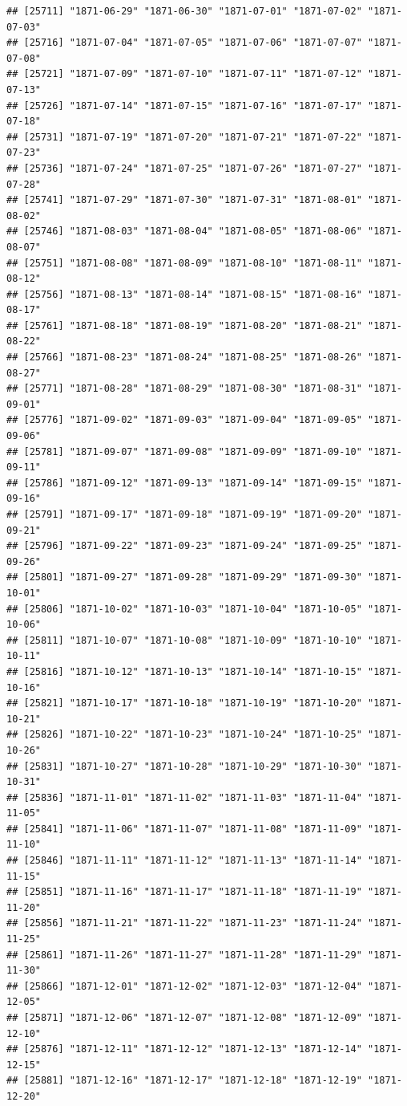 \documentclass{article}\usepackage[]{graphicx}\usepackage[]{color}
\makeatletter
\newenvironment{kframe}{%
 \def\at@end@of@kframe{}%
 \ifinner\ifhmode%
  \def\at@end@of@kframe{\end{minipage}}%
  \begin{minipage}{\columnwidth}%
 \fi\fi%
 \def\FrameCommand##1{\hskip\@totalleftmargin \hskip-\fboxsep
 \colorbox{shadecolor}{##1}\hskip-\fboxsep
     \hskip-\linewidth \hskip-\@totalleftmargin \hskip\columnwidth}%
 \MakeFramed {\advance\hsize-\width
   \@totalleftmargin\z@ \linewidth\hsize
   \@setminipage}}%
 {\par\unskip\endMakeFramed%
 \at@end@of@kframe}
\newenvironment{knitrout}{}{} %
\makeatother
\begin{document}
\begin{description}
\begin{knitrout}
\begin{kframe}
\begin{verbatim}
## [25711] "1871-06-29" "1871-06-30" "1871-07-01" "1871-07-02" "1871-07-03"
## [25716] "1871-07-04" "1871-07-05" "1871-07-06" "1871-07-07" "1871-07-08"
## [25721] "1871-07-09" "1871-07-10" "1871-07-11" "1871-07-12" "1871-07-13"
## [25726] "1871-07-14" "1871-07-15" "1871-07-16" "1871-07-17" "1871-07-18"
## [25731] "1871-07-19" "1871-07-20" "1871-07-21" "1871-07-22" "1871-07-23"
## [25736] "1871-07-24" "1871-07-25" "1871-07-26" "1871-07-27" "1871-07-28"
## [25741] "1871-07-29" "1871-07-30" "1871-07-31" "1871-08-01" "1871-08-02"
## [25746] "1871-08-03" "1871-08-04" "1871-08-05" "1871-08-06" "1871-08-07"
## [25751] "1871-08-08" "1871-08-09" "1871-08-10" "1871-08-11" "1871-08-12"
## [25756] "1871-08-13" "1871-08-14" "1871-08-15" "1871-08-16" "1871-08-17"
## [25761] "1871-08-18" "1871-08-19" "1871-08-20" "1871-08-21" "1871-08-22"
## [25766] "1871-08-23" "1871-08-24" "1871-08-25" "1871-08-26" "1871-08-27"
## [25771] "1871-08-28" "1871-08-29" "1871-08-30" "1871-08-31" "1871-09-01"
## [25776] "1871-09-02" "1871-09-03" "1871-09-04" "1871-09-05" "1871-09-06"
## [25781] "1871-09-07" "1871-09-08" "1871-09-09" "1871-09-10" "1871-09-11"
## [25786] "1871-09-12" "1871-09-13" "1871-09-14" "1871-09-15" "1871-09-16"
## [25791] "1871-09-17" "1871-09-18" "1871-09-19" "1871-09-20" "1871-09-21"
## [25796] "1871-09-22" "1871-09-23" "1871-09-24" "1871-09-25" "1871-09-26"
## [25801] "1871-09-27" "1871-09-28" "1871-09-29" "1871-09-30" "1871-10-01"
## [25806] "1871-10-02" "1871-10-03" "1871-10-04" "1871-10-05" "1871-10-06"
## [25811] "1871-10-07" "1871-10-08" "1871-10-09" "1871-10-10" "1871-10-11"
## [25816] "1871-10-12" "1871-10-13" "1871-10-14" "1871-10-15" "1871-10-16"
## [25821] "1871-10-17" "1871-10-18" "1871-10-19" "1871-10-20" "1871-10-21"
## [25826] "1871-10-22" "1871-10-23" "1871-10-24" "1871-10-25" "1871-10-26"
## [25831] "1871-10-27" "1871-10-28" "1871-10-29" "1871-10-30" "1871-10-31"
## [25836] "1871-11-01" "1871-11-02" "1871-11-03" "1871-11-04" "1871-11-05"
## [25841] "1871-11-06" "1871-11-07" "1871-11-08" "1871-11-09" "1871-11-10"
## [25846] "1871-11-11" "1871-11-12" "1871-11-13" "1871-11-14" "1871-11-15"
## [25851] "1871-11-16" "1871-11-17" "1871-11-18" "1871-11-19" "1871-11-20"
## [25856] "1871-11-21" "1871-11-22" "1871-11-23" "1871-11-24" "1871-11-25"
## [25861] "1871-11-26" "1871-11-27" "1871-11-28" "1871-11-29" "1871-11-30"
## [25866] "1871-12-01" "1871-12-02" "1871-12-03" "1871-12-04" "1871-12-05"
## [25871] "1871-12-06" "1871-12-07" "1871-12-08" "1871-12-09" "1871-12-10"
## [25876] "1871-12-11" "1871-12-12" "1871-12-13" "1871-12-14" "1871-12-15"
## [25881] "1871-12-16" "1871-12-17" "1871-12-18" "1871-12-19" "1871-12-20"

\end{verbatim}
\end{kframe}
\end{knitrout}
\end{description}
\end{document}
